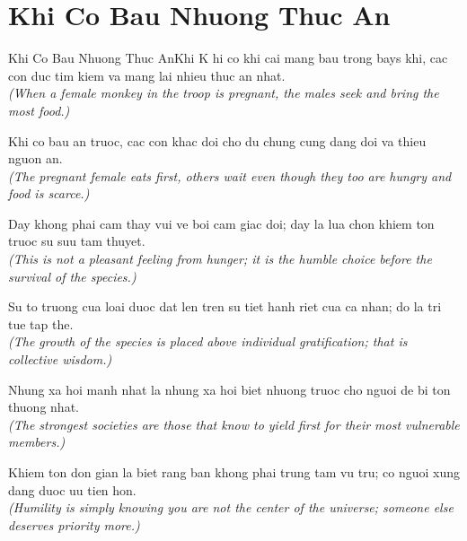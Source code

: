 \section{Khi Co Bau Nhuong Thuc An}
\begin{truyen}{Khi Co Bau Nhuong Thuc An}{Khi}
K hi co khi cai mang bau trong bays khi, cac con duc tim kiem va mang lai nhieu thuc an nhat.\\
\textit{(When a female monkey in the troop is pregnant, the males seek and bring the most food.)}

Khi co bau an truoc, cac con khac doi cho du chung cung dang doi va thieu nguon an.\\
\textit{(The pregnant female eats first, others wait even though they too are hungry and food is scarce.)}

Day khong phai cam thay vui ve boi cam giac doi; day la lua chon khiem ton truoc su suu tam thuyet.\\
\textit{(This is not a pleasant feeling from hunger; it is the humble choice before the survival of the species.)}

Su to truong cua loai duoc dat len tren su tiet hanh riet cua ca nhan; do la tri tue tap the.\\
\textit{(The growth of the species is placed above individual gratification; that is collective wisdom.)}

Nhung xa hoi manh nhat la nhung xa hoi biet nhuong truoc cho nguoi de bi ton thuong nhat.\\
\textit{(The strongest societies are those that know to yield first for their most vulnerable members.)}

\end{truyen}
\begin{baihoc}
  Khiem ton don gian la biet rang ban khong phai trung tam vu tru; co nguoi xung dang duoc uu tien hon.\\
  \textit{(Humility is simply knowing you are not the center of the universe; someone else deserves priority more.)}
\end{baihoc}
